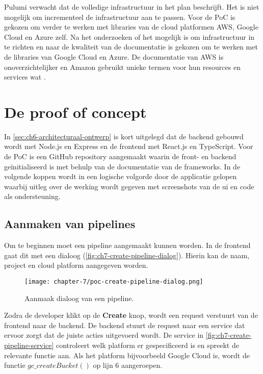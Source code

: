 Pulumi verwacht dat de volledige infrastructuur in het plan beschrijft. Het is niet mogelijk om incrementeel de infrastructuur aan te passen. Voor de PoC is gekozen om verder te werken met libraries van de cloud platformen AWS, Google Cloud en Azure zelf. Na het onderzoeken of het mogelijk is om infrastructuur in te richten en naar de kwaliteit van de documentatie is gekozen om te werken met de libraries van Google Cloud en Azure. De documentatie van AWS is onoverzichtelijker en Amazon gebruikt unieke termen voor hun resources en services wat \cite{aws-sdk-javascript-docs}.

\section{De proof of concept}\label{sec:ch7-de-proof-of-concept}
In \autoref{sec:ch6-architecturaal-ontwerp} is kort uitgelegd dat de backend gebouwd wordt met Node.js en Express en de frontend met React.js en TypeScript. Voor de PoC is een GitHub repository aangemaakt waarin de front- en backend geïnitialiseerd is met behulp van de documentatie van de frameworks. In de volgende koppen wordt in een logische volgorde door de applicatie gelopen waarbij uitleg over de werking wordt gegeven met screenshots van de \acrshort{ui} en code als ondersteuning.

\subsection{Aanmaken van pipelines}\label{subsec:ch7-aanmaken-van-pipelines}
Om te beginnen moet een pipeline aangemaakt kunnen worden. In de frontend gaat dit met een dialoog (\autoref{fig:ch7-create-pipeline-dialog}). Hierin kan de naam, project en cloud platform aangegeven worden.

\begin{figure}[hbt!]
  \centering
  \texttt{[image: chapter-7/poc-create-pipeline-dialog.png]}
  \caption{Aanmaak dialoog van een pipeline.}
  \label{fig:ch7-create-pipeline-dialog}
\end{figure}

Zodra de developer klikt op de \textbf{Create} knop, wordt een request verstuurt van de frontend naar de backend. De backend stuurt de request naar een service dat ervoor zorgt dat de juiste acties uitgevoerd wordt. De service in \autoref{fig:ch7-create-pipeline-service} controleert welk platform er gespecificeerd is en spreekt de relevante functie aan. Als het platform bijvoorbeeld Google Cloud is, wordt de functie \(gc\_createBucket()\) op lijn 6 aangeroepen.


